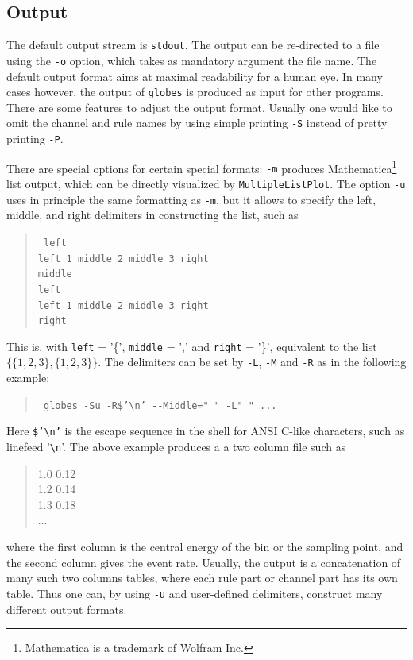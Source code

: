 \subsection*{Output}

The default output stream is {\tt stdout}. The output can be re-directed to 
a file using the {\tt -o} option, which takes as mandatory argument 
the file name. The default output format aims at maximal readability for
a human eye. In many cases however, the output of {\tt globes} is produced
as input for other programs. There are some features to adjust the
output format. Usually one would like to omit the channel and rule 
names by using simple printing {\tt -S} instead of pretty printing {\tt -P}.

There are special options for certain special formats: {\tt -m} produces
Mathematica\footnote{Mathematica is a trademark of Wolfram Inc.} list
output, which can be directly visualized by {\tt MultipleListPlot}.
The option {\tt -u} uses in principle the same formatting as {\tt -m}, but
it allows to specify the left, middle, and right delimiters in constructing
the list, such as
\begin{quote}
{\tt
left\\
left 1 middle 2 middle 3 right\\
middle\\
left\\
left 1 middle 2 middle 3 right\\
right\\
}
\end{quote}
This is, with {\tt left} = '\{', {\tt middle} = ',' and {\tt right} = '\}',
equivalent to the list $\{\{1,2,3\},\{1,2,3\}\}$. 
The delimiters can be set by {\tt -L}, {\tt -M} and {\tt -R} as in the 
following example:
\begin{quote}
{\tt
globes -Su -R\$'\verb+\n+' \verb+--+Middle=" " -L" " ...
}
\end{quote}
Here {\tt \$'\verb+\n+'} is the escape sequence in the shell for ANSI C-like characters, such as linefeed '\verb+\n+'. The above example
produces a a two column file such as
\begin{quote}
1.0 0.12\\
1.2 0.14\\
1.3 0.18\\
...
\end{quote}
where the first column is the central energy of the bin or the sampling point,
 and
the second column gives the event rate. Usually, the output is a concatenation of many such two columns tables, where 
each rule part or channel part has its own table. Thus one can, by using
{\tt -u} and user-defined delimiters, construct many different  
output formats.

